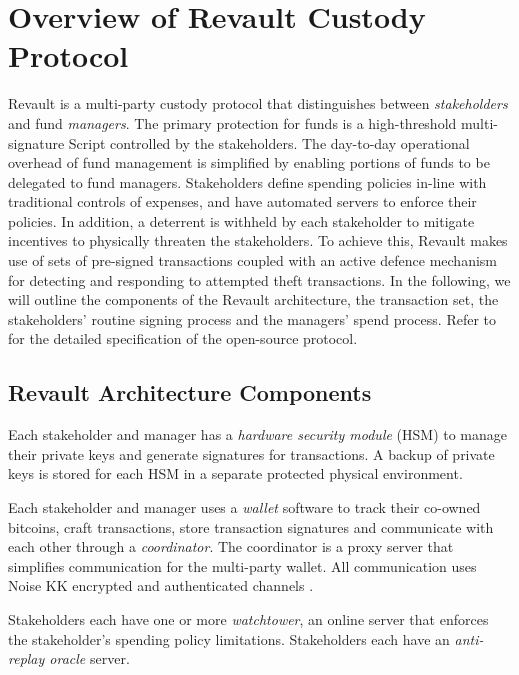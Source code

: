 \documentclass[runningheads]{llncs}
\begin{document}
\section{Overview of Revault Custody Protocol}
\label{sec:RevaultOverview}

Revault is a multi-party custody protocol that distinguishes between \textit{stakeholders} and fund \textit{managers}.
The primary protection for funds is a high-threshold multi-signature Script controlled by the stakeholders. 
The day-to-day operational overhead of fund management is simplified by enabling portions of funds to be delegated to fund managers.  Stakeholders define spending policies in-line with traditional controls of expenses, and have automated servers to enforce their policies. In addition, a deterrent is withheld by each stakeholder to mitigate incentives to physically threaten the stakeholders. To achieve this, Revault makes use of sets of pre-signed transactions coupled with an active defence mechanism for detecting and responding to attempted theft transactions. In the following, we will outline the components of the Revault architecture, the transaction set,
 the stakeholders' routine signing process and the managers' spend process. Refer to \cite{practical-revault} for the detailed specification of the open-source protocol.

\subsection{Revault Architecture Components}
\label{subsec:Components}

Each stakeholder and manager has a \textit{hardware security module} (HSM) to manage their private keys and generate signatures for transactions. A backup of private keys is stored for each HSM in a separate protected physical environment. 

Each stakeholder and manager uses a \textit{wallet} software to track their co-owned bitcoins, craft transactions, store transaction signatures and communicate with each other through a \textit{coordinator}. The coordinator is a proxy server that simplifies communication for the multi-party wallet. All communication uses Noise KK encrypted and authenticated channels \cite{NoiseProtocolFramework}.

Stakeholders each have one or more \textit{watchtower}, an online server that enforces the stakeholder's spending policy limitations. 
Stakeholders each have an \textit{anti-replay oracle} server.
\end{document}
